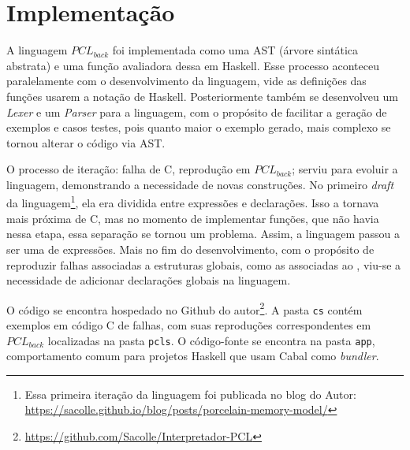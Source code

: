 \section{Implementação}

A linguagem $PCL_{back}$ foi implementada como uma AST (árvore sintática abstrata) e uma função avaliadora dessa em Haskell. Esse processo aconteceu paralelamente com o desenvolvimento da linguagem, vide as definições das funções usarem a notação de Haskell. Posteriormente também se desenvolveu um \emph{Lexer} e um \emph{Parser} para a linguagem, com o propósito de facilitar a geração de exemplos e casos testes, pois quanto maior o exemplo gerado, mais complexo se tornou alterar o código via AST. 

O processo de iteração: falha de C, reprodução em $PCL_{back}$; serviu para evoluir a linguagem, demonstrando a necessidade de novas construções. No primeiro \emph{draft} da linguagem\footnote{Essa primeira iteração da linguagem foi publicada no blog do Autor: \url{https://sacolle.github.io/blog/posts/porcelain-memory-model/}}, ela era dividida entre expressões e declarações. Isso a tornava mais próxima de C, mas no momento de implementar funções, que não havia nessa etapa, essa separação se tornou um problema. Assim, a linguagem passou a ser uma de expressões. Mais no fim do desenvolvimento, com o propósito de reproduzir falhas associadas a estruturas globais, como as associadas ao \FREE, viu-se a necessidade de adicionar declarações globais na linguagem.


O código se encontra hospedado no Github do autor\footnote{\url{https://github.com/Sacolle/Interpretador-PCL}}. A pasta \texttt{cs} contém exemplos em código C de falhas, com suas reproduções correspondentes em $PCL_{back}$ localizadas na pasta \texttt{pcls}. O código-fonte se encontra na pasta \texttt{app}, comportamento comum para projetos Haskell que usam Cabal como \emph{bundler}. 